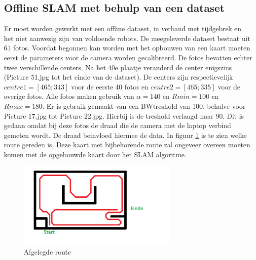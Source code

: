 \documentclass[a4paper]{article}
\begin{document}
\subsection{Offline SLAM met behulp van een dataset}
Er moet worden gewerkt met een offline dataset, in verband met tijdgebrek en het niet aanwezig zijn van voldoende robots. De meegeleverde dataset bestaat uit 61 fotos.
Voordat begonnen kan worden met het opbouwen van een kaart moeten eerst de parameters voor de camera worden gecalibreerd. De fotos bevatten echter twee verschillende centers. Na het 40e plaatje veranderd de center enigszins (Picture 51.jpg tot het einde van de dataset). De centers zijn respectievelijk $centre1 = [465;343]$ voor de eerste 40 fotos en $centre2=[465;335]$ voor de overige fotos. Alle fotos maken gebruik van $\alpha = 140$ en $Rmin = 100$ en $Rmax = 180$. Er is gebruik gemaakt van een BWtreshold van 100, behalve voor Picture 17.jpg tot Picture 22.jpg. Hierbij is de treshold verlaagd naar 90. Dit is gedaan omdat bij deze fotos de draad die de camera met de laptop verbind gemeten wordt. De draad beinvloed hiermee de data. In figuur \ref{fig:route} is te zien welke route gereden is.
Deze kaart met bijbehorende route zal ongeveer overeen moeten komen met de opgebouwde kaart door het SLAM algoritme.
\begin{figure}[h]
	\centering
	\includegraphics[width=0.7\textwidth]{matlab/imgs/route.png}
	\caption{Afgelegde route}
	\label{fig:route}
\end{figure}
\end{document}
